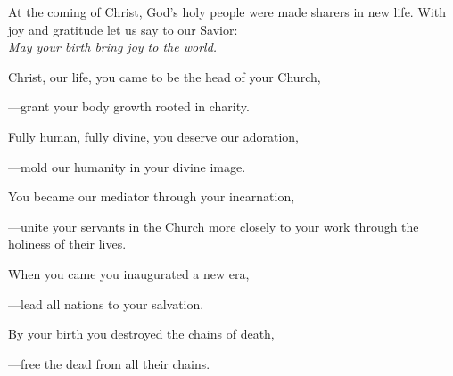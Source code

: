 \intercessions\indent

\begin{hangpar}

At the coming of Christ, God’s holy people were made sharers in new life. With joy and gratitude let us say to our Savior:\\
\emph{May your birth bring joy to the world.}

\medskip Christ, our life, you came to be the head of your Church,

{\color{red}---\thinspace}grant your body growth rooted in charity.

\medskip Fully human, fully divine, you deserve our adoration,

{\color{red}---\thinspace}mold our humanity in your divine image.

\medskip You became our mediator through your incarnation,

{\color{red}---\thinspace}unite your servants in the Church more closely to your work through the holiness of their lives.

\medskip When you came you inaugurated a new era,

{\color{red}---\thinspace}lead all nations to your salvation.

\medskip By your birth you destroyed the chains of death,

{\color{red}---\thinspace}free the dead from all their chains.

\medskip

\end{hangpar}